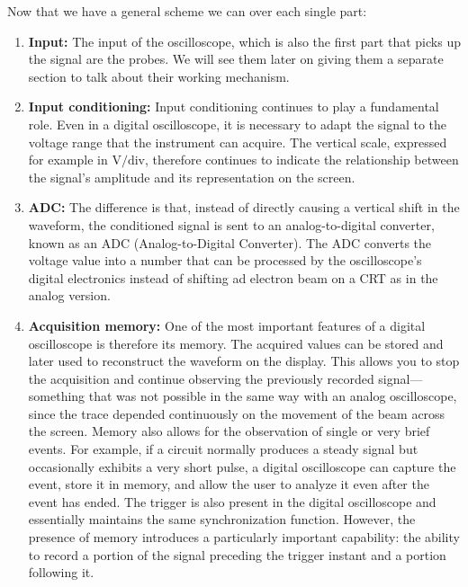 \documentclass[../main.tex]{subfiles}
\begin{document}
Now that we have a general scheme we can over each single part:

\begin{enumerate}[label=\textbf{-}]
	\item \textbf{Input:} The input of the oscilloscope, which is also the first part that picks up the signal are the probes. We will see them later on giving them a separate section to talk about their working mechanism.
	
	\item \textbf{Input conditioning:} Input conditioning continues to play a fundamental role. Even in a digital oscilloscope, it is necessary to adapt the signal to the voltage range that the instrument can acquire. The vertical scale, expressed for example in $\mathrm{V/div}$, therefore continues to indicate the relationship between the signal’s amplitude and its representation on the screen.
	
	\item \textbf{ADC:} The difference is that, instead of directly causing a vertical shift in the waveform, the conditioned signal is sent to an analog-to-digital converter, known as an ADC (Analog-to-Digital Converter). The ADC converts the voltage value into a number that can be processed by the oscilloscope's digital electronics instead of shifting ad electron beam on a CRT as in the analog version.
	
	\item \textbf{Acquisition memory:} One of the most important features of a digital oscilloscope is therefore its memory. The acquired values can be stored and later used to reconstruct the waveform on the display. This allows you to stop the acquisition and continue observing the previously recorded signal—something that was not possible in the same way with an analog oscilloscope, since the trace depended continuously on the movement of the beam across the screen. Memory also allows for the observation of single or very brief events. For example, if a circuit normally produces a steady signal but occasionally exhibits a very short pulse, a digital oscilloscope can capture the event, store it in memory, and allow the user to analyze it even after the event has ended. The trigger is also present in the digital oscilloscope and essentially maintains the same synchronization function. However, the presence of memory introduces a particularly important capability: the ability to record a portion of the signal preceding the trigger instant and a portion following it.


\end{enumerate}
\end{document}
